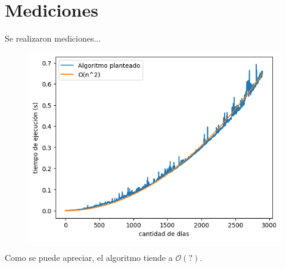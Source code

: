 \section{Mediciones}

Se realizaron mediciones...

\begin{figure}[H]
    \centering
    \includegraphics[width=1\textwidth]{img/tiempos.png}
\end{figure}

Como se puede apreciar, el algoritmo tiende a $\mathcal{O}(?)$.
